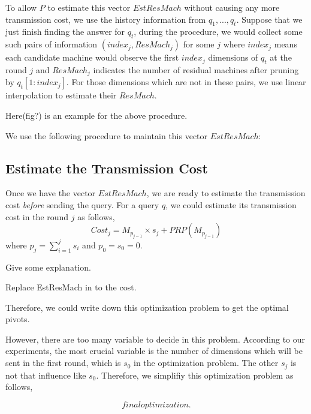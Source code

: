 To allow $P$ to  estimate this vector $EstResMach$ without causing any more transmission cost, we use the history information from $q_1,...,q_t$.  Suppose that we just finish finding the answer for $q_t$, during the procedure, we would collect some such pairs of information $(index_j, ResMach_j)$ for some $j$ where $index_j$ means each candidate machine would observe the first $index_j$ dimensions of $q_t$ at the round $j$ and $ResMach_j$ indicates the number of residual machines after pruning by $q_t[1:index_j]$.  For those dimensions which are not in these pairs, we use linear interpolation to estimate their $ResMach$.  

Here(fig?) is an example for the above procedure.



We use the following procedure to maintain this vector $EstResMach$:








\subsection{Estimate the Transmission Cost} %
\label{ss:estimate_the_transmission_cost}

Once we have the vector $EstResMach$, we are ready to estimate the transmission cost \emph{before} sending the query.  For a query $q$, we could estimate its transmission cost in the round $j$ as follows,
\[
Cost_j = M_{p_{j-1}}\times s_j + PRP(M_{p_{j-1}})
\]
where $p_j=\sum^j_{i=1}{s_i}$ and $p_0=s_0=0$.

Give some explanation.

Replace EstResMach in to the cost.

Therefore, we could write down this optimization problem to get the optimal pivots.

However, there are too many variable to decide in this problem.  According to our experiments, the most crucial variable is the number of dimensions which will be sent in the first round, which is $s_0$ in the optimization problem.  The other $s_j$ is not that influence like $s_0$.  Therefore, we simplifiy this optimization problem as follows,

\[
final optimization.
\]




